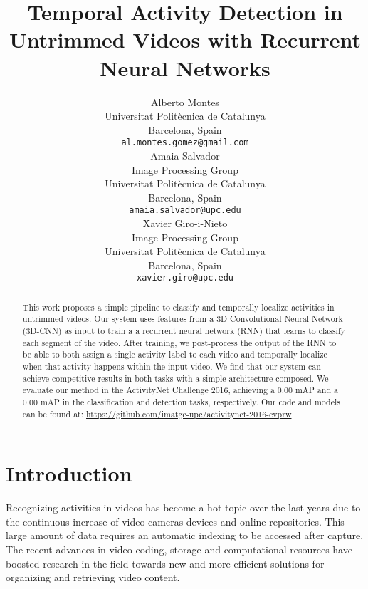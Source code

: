 \documentclass{article}
\title{Temporal Activity Detection in Untrimmed Videos with Recurrent Neural Networks}
\author{
    Alberto Montes \\
    Universitat Politècnica de Catalunya \\
    Barcelona, Spain \\
    \texttt{al.montes.gomez@gmail.com} \\
    \And
    Amaia Salvador \\
    Image Processing Group \\
    Universitat Politècnica de Catalunya \\
    Barcelona, Spain \\
    \texttt{amaia.salvador@upc.edu} \\
    \And
    Xavier Giro-i-Nieto \\
    Image Processing Group \\
    Universitat Politècnica de Catalunya \\
    Barcelona, Spain \\
    \texttt{xavier.giro@upc.edu} \\
}
\begin{document}

\maketitle

\begin{abstract}


    
    This work proposes a simple pipeline to classify and temporally localize activities in untrimmed videos. Our system uses features from a 3D Convolutional Neural Network (3D-CNN) as input to train a a recurrent neural network (RNN) that learns to classify each segment of the video. After training, we post-process the output of the RNN to be able to both assign a single activity label to each video and temporally localize when that activity happens within the input video. We find that our system can achieve competitive results in both tasks with a simple architecture composed. We evaluate our method in the ActivityNet Challenge 2016, achieving a 0.00 mAP and a 0.00 mAP in the classification and detection tasks, respectively. Our code and models can be found at: \url{ https://github.com/imatge-upc/activitynet-2016-cvprw}

\end{abstract}

\section{Introduction}

Recognizing activities in videos has become a hot topic over the last years due to the continuous increase of video cameras devices and online repositories.
This large amount of data requires an automatic indexing to be accessed after capture.
The recent advances in video coding, storage and computational resources have boosted research in the field towards new and more efficient solutions for organizing and retrieving video content.
\end{document}
